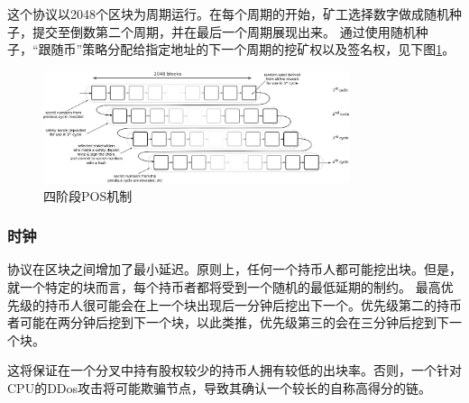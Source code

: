 \documentclass[letterpaper]{article}
\begin{document}
这个协议以\num{2048}个区块为周期运行。在每个周期的开始，矿工选择数字做成随机种子，提交至倒数第二个周期，并在最后一个周期展现出来。
通过使用随机种子，“跟随币”策略分配给指定地址的下一个周期的挖矿权以及签名权，见下图\ref{fig:pos_figure}。

\begin{figure}[b!]
  \centering
  \includegraphics[width=0.8\textwidth]{pos_figure.eps}
  \caption{四阶段POS机制}
  \label{fig:pos_figure}
\end{figure}


\subsubsection{时钟}

协议在区块之间增加了最小延迟。原则上，任何一个持币人都可能挖出块。但是，就一个特定的块而言，每个持币者都将受到一个随机的最低延期的制约。
最高优先级的持币人很可能会在上一个块出现后一分钟后挖出下一个。优先级第二的持币者可能在两分钟后挖到下一个块，以此类推，优先级第三的会在三分钟后挖到下一个块。

这将保证在一个分叉中持有股权较少的持币人拥有较低的出块率。否则，一个针对CPU的DDos攻击将可能欺骗节点，导致其确认一个较长的自称高得分的链。
\end{document}
